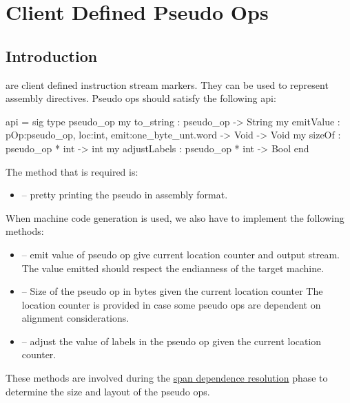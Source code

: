 \section{Client Defined Pseudo Ops}
\subsection{Introduction}
are client defined instruction stream markers.  They
can be used to represent assembly directives.
Pseudo ops should satisfy the following api:
\begin{SML}
api  = sig
  type pseudo_op
  my to_string : pseudo_op -> String
  my emitValue : {pOp:pseudo_op, loc:int, emit:one_byte_unt.word -> Void} -> Void
  my sizeOf : pseudo_op * int -> int
  my adjustLabels : pseudo_op * int -> Bool
end
\end{SML}

The method that is required is:
\begin{itemize}
 \item {} -- pretty printing the pseudo in assembly format.
\end{itemize}

When machine code generation is used, we also have to implement
the following methods:
\begin{itemize}
 \item {} --
    emit value of pseudo op give current location counter and output
    stream. The value emitted should respect the endianness of the
    target machine.
 \item {} --
    Size of the pseudo op in bytes given the current location counter
    The location counter is provided in case some pseudo ops are 
    dependent on alignment considerations.
 \item {} --
    adjust the value of labels in the pseudo op given the current
    location counter.
\end{itemize}
These methods are involved during the 
\href{span-dep.html}{span dependence resolution} phase to determine
the size and layout of the pseudo ops.
